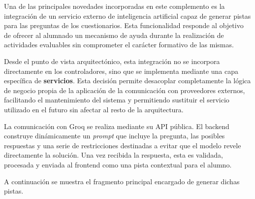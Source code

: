 Una de las principales novedades incorporadas en este complemento es la integración de un servicio externo de inteligencia artificial capaz de generar pistas para las preguntas de los cuestionarios. Esta funcionalidad responde al objetivo de ofrecer al alumnado un mecanismo de ayuda durante la realización de actividades evaluables sin comprometer el carácter formativo de las mismas.

Desde el punto de vista arquitectónico, esta integración no se incorpora directamente en los controladores, sino que se implementa mediante una capa específica de \textbf{servicios}. Esta decisión permite desacoplar completamente la lógica de negocio propia de la aplicación de la comunicación con proveedores externos, facilitando el mantenimiento del sistema y permitiendo sustituir el servicio utilizado en el futuro sin afectar al resto de la arquitectura.

La comunicación con Groq se realiza mediante su API pública. El backend construye dinámicamente un \textit{prompt} \cite{PromptEngineeringGuide} que incluye la pregunta, las posibles respuestas y una serie de restricciones destinadas a evitar que el modelo revele directamente la solución. Una vez recibida la respuesta, esta es validada, procesada y enviada al frontend como una pista contextual para el alumno.

A continuación se muestra el fragmento principal encargado de generar dichas pistas.

